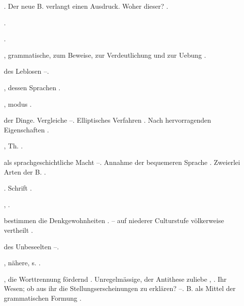\begin{register}
. Der neue B. verlangt einen Ausdruck. Woher dieser? \pageref{sp.230}.

 \pageref{sp.45}.

 \pageref{sp.231}.

, grammatische, zum Beweise, zur Verdeutlichung und zur Uebung \pageref{sp.116}.

 des Leblosen \pageref{sp.315}–\pageref{sp.317}.


, dessen Sprachen \pageref{sp.54}.

, modus \pageref{sp.114}.

 der Dinge. Vergleiche \pageref{sp.40}–\pageref{sp.43}. Elliptisches Verfahren \pageref{sp.366}. Nach hervorragenden Eigenschaften \pageref{sp.381}.

, Th. \sed{\pageref{sp.252},} \pageref{sp.295}.



 als sprachgeschichtliche Macht \pageref{sp.181}–\pageref{sp.185}\sed{, \pageref{sp.256}}. Annahme der bequemeren Sprache \pageref{sp.262}. Zweierlei Arten der B. \pageref{sp.429}.

. Schrift \pageref{sp.131}.

 \pageref{sp.142}, \pageref{sp.160}\sed{, \pageref{sp.299}}. 



 bestimmen die Denkgewohnheiten \pageref{sp.44}. – auf niederer Culturstufe völkerweise vertheilt \pageref{sp.44}.

 des Unbeseelten \pageref{sp.315}–\pageref{sp.317}.

, nähere, s. .

, die Worttrennung fördernd \pageref{sp.132}. Unregelmässige, der Antithese zuliebe \pageref{sp.227}, \pageref{sp.375}. Ihr Wesen; ob aus ihr die Stellungserscheinungen zu erklären? \pageref{sp.373}–\pageref{sp.376}. B. als Mittel der grammatischen Formung \pageref{sp.451}.


\end{register}
